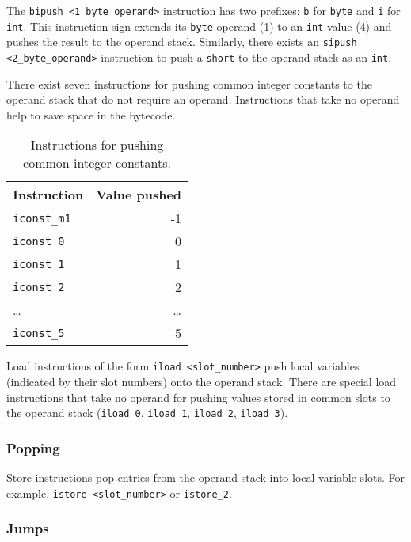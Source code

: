 The \texttt{bipush <1\_byte\_operand>} instruction has two prefixes: \texttt{b} for \texttt{byte} and \texttt{i} for \texttt{int}.
This instruction sign extends its \texttt{byte} operand (\SI{1}{\byte}) to an \texttt{int} value (\SI{4}{\byte}) and pushes the result to the operand stack.
Similarly, there exists an \texttt{sipush <2\_byte\_operand>} instruction to push a \texttt{short} to the operand stack as an \texttt{int}.

There exist seven instructions for pushing common integer constants to the operand stack that do not require an operand.
Instructions that take no operand help to save space in the bytecode.

\begin{table}[htp]
  \centering
  \caption*{Instructions for pushing common integer constants.}
  \begin{tabular}{lr}
    \toprule
    Instruction & Value pushed \\
    \midrule
    \texttt{iconst\_m1} & -1 \\
    \texttt{iconst\_0}  &  0 \\
    \texttt{iconst\_1}  &  1 \\
    \texttt{iconst\_2}  &  2 \\
    \ldots & \ldots \\
    \texttt{iconst\_5}  &  5 \\
    \bottomrule
  \end{tabular}
\end{table}

Load instructions of the form \texttt{iload <slot\_number>} push local variables (indicated by their slot numbers) onto the operand stack.
There are special load instructions that take no operand for pushing values stored in common slots to the operand stack (\texttt{iload\_0}, \texttt{iload\_1}, \texttt{iload\_2}, \texttt{iload\_3}).

\subsubsection{Popping}

Store instructions pop entries from the operand stack into local variable slots.
For example, \texttt{istore <slot\_number>} or \texttt{istore\_2}.

\subsubsection{Jumps}

